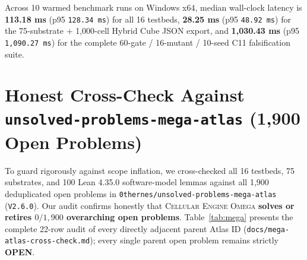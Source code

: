 \documentclass[11pt,reqno]{amsart}
\begin{document}
Across 10 warmed benchmark runs on Windows x64, median wall-clock latency is \textbf{113.18 ms} (p95 \texttt{128.34 ms}) for all 16 testbeds, \textbf{28.25 ms} (p95 \texttt{48.92 ms}) for the 75-substrate + 1,000-cell Hybrid Cube JSON export, and \textbf{1,030.43 ms} (p95 \texttt{1,090.27 ms}) for the complete 60-gate / 16-mutant / 10-seed C11 falsification suite.

\section{Honest Cross-Check Against \texorpdfstring{\texttt{unsolved-problems-mega-atlas}}{unsolved-problems-mega-atlas} (1,900 Open Problems)}
\label{sec:mega}

To guard rigorously against scope inflation, we cross-checked all 16 testbeds, 75 substrates, and 100 Lean 4.35.0 software-model lemmas against all 1,900 deduplicated open problems in \nolinkurl{0thernes/unsolved-problems-mega-atlas} (\texttt{V2.6.0}). Our audit confirms honestly that \textsc{Cellular Engine Omega} \textbf{solves or retires $0 / 1{,}900$ overarching open problems}. Table~\ref{tab:mega} presents the complete 22-row audit of every directly adjacent parent Atlas ID (\nolinkurl{docs/mega-atlas-cross-check.md}); every single parent open problem remains strictly \textbf{OPEN}.
\end{document}
